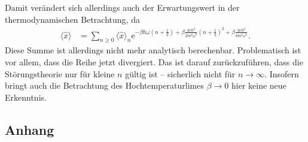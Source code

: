 \documentclass[english, parskip=full]{scrartcl}
\newcommand\numberthis{\addtocounter{equation}{1}\tag{\theequation}}
\renewcommand{\bra}{}
\renewcommand{\braket}{}
\newcommand{\kla}{}
\newcommand{\klam}{}
\newcommand{\Bra}{}
\newcommand{\Ket}{}
\newcommand{\e}{\text{e}}
\begin{document}
Damit verändert sich allerdings auch der Erwartungswert in der thermodynamischen Betrachtung, da
\begin{align}
\bra\langle \hat{x} \rangle &= \sum_{n\ge 0} \bra\langle \hat{x} \rangle_n \e^{-\beta\hbar\omega\kla\left( n+\frac{1}{2} \right) + \beta \frac{3c\hbar^2}{2m^2\omega^2} \kla\left( n+\frac{1}{2} \right)^2 + \beta \frac{3c\hbar^2}{8m^2\omega^2}}.
\end{align}
Diese Summe ist allerdings nicht mehr analytisch berechenbar.
Problematisch ist vor allem, dass die Reihe jetzt divergiert.
Das ist darauf zurückzuführen, dass die Störungstheorie nur für kleine $n$ gültig ist -- sicherlich nicht für $n\rightarrow\infty$.
Insofern bringt auch die Betrachtung des Hochtemperaturlimes $\beta\rightarrow 0$ hier keine neue Erkenntnis.
\subsection*{Anhang}
\end{document}
